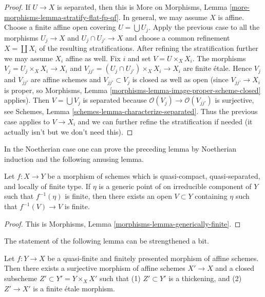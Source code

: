 \begin{proof}
If $U \to X$ is separated, then this is
More on Morphisms, Lemma \ref{more-morphisms-lemma-stratify-flat-fp-qf}.
In general, we may assume $X$ is affine. Choose a finite affine open
covering $U = \bigcup U_j$. Apply the previous case to all the morphisms
$U_j \to X$ and $U_j \cap U_{j'} \to X$ and choose a common
refinement $X = \coprod X_i$ of the resulting stratifications.
After refining the stratification further we may assume $X_i$ affine as well.
Fix $i$ and set $V = U \times_X X_i$. The morphisms
$V_j = U_j \times_X X_i \to X_i$ and
$V_{jj'} = (U_j \cap U_{j'}) \times_X X_i \to X_i$ are finite \'etale.
Hence $V_j$ and $V_{jj'}$ are affine schemes and $V_{jj'} \subset V_j$
is closed as well as open (since $V_{jj'} \to X_i$ is proper, so
Morphisms, Lemma \ref{morphisms-lemma-image-proper-scheme-closed}
applies). Then $V = \bigcup V_j$ is separated because
$\mathcal{O}(V_j) \to \mathcal{O}(V_{jj'})$ is surjective, see
Schemes, Lemma \ref{schemes-lemma-characterize-separated}.
Thus the previous case applies to $V \to X_i$ and we can further
refine the stratification if needed (it actually isn't but we don't
need this).
\end{proof}

\noindent
In the Noetherian case one can prove the preceding lemma by
Noetherian induction and the following amusing lemma.

\begin{lemma}
\label{lemma-generically-finite}
Let $f: X \to Y$ be a morphism of schemes which is quasi-compact,
quasi-separated, and locally of finite type. If $\eta$ is a generic point
of on irreducible component of $Y$ such that $f^{-1}(\eta)$ is finite, then
there exists an open $V \subset Y$ containing $\eta$ such that
$f^{-1}(V) \to V$ is finite.
\end{lemma}

\begin{proof}
This is Morphisms, Lemma \ref{morphisms-lemma-generically-finite}.
\end{proof}

\noindent
The statement of the following lemma can be strengthened a bit.

\begin{lemma}
\label{lemma-decompose-quasi-finite-morphism}
Let $f : Y \to X$ be a quasi-finite and finitely presented
morphism of affine schemes. Then there exists a surjective morphism
of affine schemes $X' \to X$ and a closed subscheme
$Z' \subset Y' = Y \times_X X'$ such that (1) $Z' \subset Y'$
is a thickening, and (2) $Z' \to X'$ is a finite \'etale morphism.
\end{lemma}

